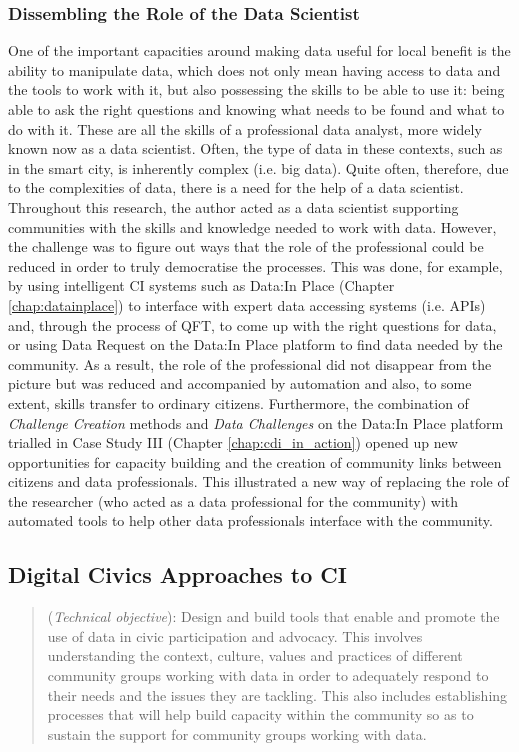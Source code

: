 \subsubsection{Dissembling the Role of the Data Scientist}
One of the important capacities around making data useful for local benefit is the ability to manipulate data, which does not only mean having access to data and the tools to work with it, but also possessing the skills to be able to use it: being able to ask the right questions and knowing what needs to be found and what to do with it. These are all the skills of a professional data analyst, more widely known now as a data scientist. Often, the type of data in these contexts, such as in the smart city, is inherently complex (i.e. big data). Quite often, therefore, due to the complexities of data, there is a need for the help of a data scientist. Throughout this research, the author acted as a data scientist supporting communities with the skills and knowledge needed to work with data. However, the challenge was to figure out ways that the role of the professional could be reduced in order to truly democratise the processes. This was done, for example, by using intelligent CI systems such as Data:In Place (Chapter \ref{chap:datainplace}) to interface with expert data accessing systems (i.e. APIs) and, through the process of QFT, to come up with the right questions for data, or using Data Request on the Data:In Place platform to find data needed by the community. As a result, the role of the professional did not disappear from the picture but was reduced and accompanied by automation and also, to some extent, skills transfer to ordinary citizens. Furthermore, the combination of \textit{Challenge Creation} methods and \textit{Data Challenges} on the Data:In Place platform trialled in Case Study III (Chapter \ref{chap:cdi_in_action}) opened up new opportunities for capacity building and the creation of community links between citizens and data professionals. This illustrated a new way of replacing the role of the researcher (who acted as a data professional for the community) with automated tools to help other data professionals interface with the community.

\subsection{Digital Civics Approaches to CI}
\begin{quote}
    (\textit{Technical objective}): Design and build tools that enable and promote the use of data in civic participation and advocacy. This involves understanding the context, culture, values and practices of different community groups working with data in order to adequately respond to their needs and the issues they are tackling. This also includes establishing processes that will help build capacity within the community so as to sustain the support for community groups working with data.
\end{quote}

